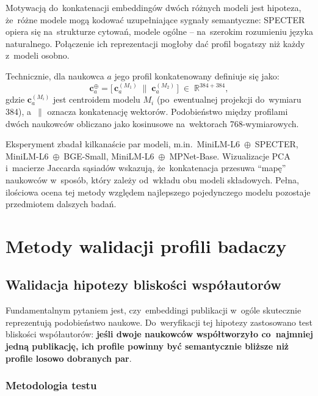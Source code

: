 Motywacją do~konkatenacji embeddingów dwóch różnych modeli jest hipoteza,
że~różne modele mogą kodować uzupełniające sygnały semantyczne:
SPECTER opiera się na~strukturze cytowań, modele ogólne --
na~szerokim rozumieniu języka naturalnego.
Połączenie ich reprezentacji mogłoby dać profil bogatszy
niż każdy z~modeli osobno.

Technicznie, dla naukowca $a$ jego profil konkatenowany definiuje się jako:
\begin{equation}
    \mathbf{c}^{\oplus}_{a} =
    \bigl[\,\mathbf{c}^{(M_1)}_{a} \;\|\; \mathbf{c}^{(M_2)}_{a}\,\bigr]
    \;\in\; \mathbb{R}^{384+384},
\end{equation}
gdzie $\mathbf{c}^{(M_i)}_{a}$ jest centroidem modelu $M_i$
(po~ewentualnej projekcji do~wymiaru 384),
a~$\|$ oznacza konkatenację wektorów.
Podobieństwo między profilami dwóch naukowców obliczano
jako kosinusowe na~wektorach 768-wymiarowych.

Eksperyment zbadał kilkanaście par modeli,
m.in.\ MiniLM-L6~$\oplus$~SPECTER,
MiniLM-L6~$\oplus$~BGE-Small,
MiniLM-L6~$\oplus$~MPNet-Base.
Wizualizacje PCA i~macierze Jaccarda sąsiadów wskazują,
że~konkatenacja przesuwa ``mapę'' naukowców w~sposób,
który zależy od~wkładu obu modeli składowych.
Pełna, ilościowa ocena tej metody względem najlepszego
pojedynczego modelu pozostaje przedmiotem dalszych badań.

\section{Metody walidacji profili badaczy}
\label{sec:validation}

\subsection{Walidacja hipotezy bliskości współautorów}
\label{subsec:validation_coauthor}

Fundamentalnym pytaniem jest, czy~embeddingi publikacji
w~ogóle skutecznie reprezentują podobieństwo naukowe.
Do~weryfikacji tej hipotezy zastosowano test bliskości współautorów:
\textbf{jeśli dwoje naukowców współtworzyło co~najmniej jedną publikację,
ich profile powinny być semantycznie bliższe niż profile
losowo dobranych par}.

\subsubsection{Metodologia testu}

